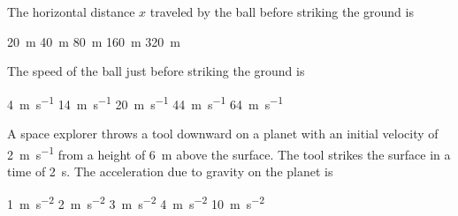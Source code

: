 \documentclass{../../../oss-ap12ibhl-print}
\begin{document}
\begin{questions}
  \question The horizontal distance $x$ traveled by the ball before striking the
  ground is

  \begin{oneparchoices}
    \choice\SI{20}{\metre}\hspace{.4in}
    \choice\SI{40}{\metre}\hspace{.4in}
    \choice\SI{80}{\metre}\hspace{.4in} 
    \choice\SI{160}{\metre}\hspace{.4in}
    \choice\SI{320}{\metre}
  \end{oneparchoices}

  \question The speed of the ball just before striking the ground is

  \begin{oneparchoices}
    \choice\SI{4}{\metre\per\second}\hspace{.3in}
    \choice\SI{14}{\metre\per\second}\hspace{.3in}
    \choice\SI{20}{\metre\per\second}\hspace{.3in}
    \choice\SI{44}{\metre\per\second}\hspace{.3in}
    \choice\SI{64}{\metre\per\second}
  \end{oneparchoices}
  
  \uplevel{\rule{\linewidth}{.6pt}}

  \question A space explorer throws a tool downward on a planet with an initial
  velocity of \SI{2}{\metre\per\second} from a height of \SI{6}{\metre}
  above the surface. The tool strikes the surface in a time of \SI{2}{\second}.
  The acceleration due to gravity on the planet is

  \begin{oneparchoices}
    \choice\SI{1}{\metre\per\second\squared}\hspace{.27in}
    \choice\SI{2}{\metre\per\second\squared}\hspace{.27in}
    \choice\SI{3}{\metre\per\second\squared}\hspace{.27in}
    \choice\SI{4}{\metre\per\second\squared}\hspace{.27in}
    \choice\SI{10}{\metre\per\second\squared}
  \end{oneparchoices}
  
  \uplevel{\rule{\linewidth}{.6pt}}

  

\end{questions}
\end{document}
